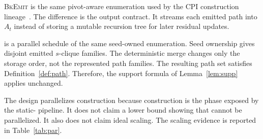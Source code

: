 \textsc{BkEmit} is the same pivot-aware enumeration used by the CPI construction lineage~\cite{Pivoter,NuclearCD}.
%
The difference is the output contract.
%
It streams each emitted path into \(A_t\) instead of storing a mutable recursion tree for later residual updates.

\paraBuild{} is a parallel schedule of the same seed-owned enumeration.
%
Seed ownership gives disjoint emitted \(s\)-clique families.
%
The deterministic merge changes only the storage order, not the represented path families.
%
The resulting path set satisfies Definition~\ref{def:path}.
%
Therefore, the support formula of Lemma~\ref{lem:supp} applies unchanged.

The design parallelizes construction because construction is the phase exposed by the static-\cpi{} pipeline.
%
It does not claim a lower bound showing that \peelH{} cannot be parallelized.
%
It also does not claim ideal scaling.
%
The scaling evidence is reported in Table~\ref{tab:par}.
